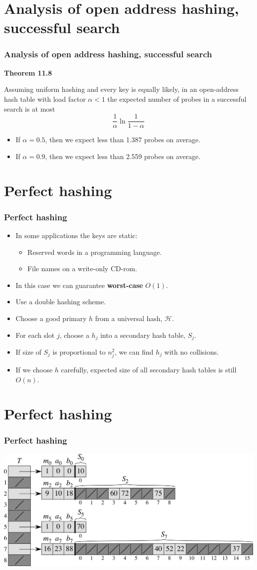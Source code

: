 \documentclass{beamer}
\newcommand{\bi}{\begin{itemize}}
\newcommand{\ii}{\item}
\newcommand{\ei}{\end{itemize}}
\newcommand{\sect}[1]{
\section{#1}
\begin{frame}[fragile]\frametitle{#1}
}
\begin{document}
\sect{Analysis of open address hashing, successful search}

{\bf Theorem 11.8}

Assuming uniform hashing and every key is equally likely,
in an open-address hash table with load factor $\alpha < 1$
the expected number of probes in a successful search is at most
\[
\frac{1}{\alpha}\ln\frac{1}{1-\alpha}
\]

\bi
\ii If $\alpha = 0.5$, then we expect less than 1.387 probes on
average.
\ii If $\alpha = 0.9$, then we expect less than 2.559 probes on
average. 
\ei

\end{frame}

\sect{Perfect hashing}

\bi
\ii In some applications the keys are static:
\bi
\ii Reserved words in a programming language.
\ii File names on a write-only CD-rom.
\ei
\ii In this case we can guarantee {\bf worst-case} $O(1)$.
\ii Use a double hashing scheme.
\ii Choose a good primary $h$ from a universal hash, $\mathcal{H}$.
\ii For each slot $j$, choose a $h_j$ into a secondary hash table, $S_j$.
\ii If size of $S_j$ is proportional to $n_j^2$, we can find
$h_j$ with no collisions.
\ii If we choose $h$ carefully, expected
size of all secondary hash tables is
still $O(n)$.
\ei

\end{frame}

\sect{Perfect hashing}
\includegraphics[width=\textwidth]{Fig-11-6.pdf}
\end{frame}
\end{document}
